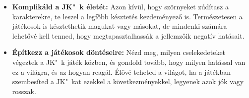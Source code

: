 \begin{itemize}
    \item \textbf{Komplikáld a JK"~k életét:} Azon kívül, hogy szörnyeket zúdítasz a karakterekre, te leszel a legfőbb késztetés kezdeményező is. Természetesen a játékosok is késztethetik magukat vagy másokat, de mindenki számára lehetővé kell tenned, hogy megtapasztalhassák a jellemzőik negatív hatásait.
    \item \textbf{Építkezz a játékosok döntéseire:} Nézd meg, milyen cselekedeteket végeztek a JK"~k játék közben, és gondold tovább, hogy milyen hatással van ez a világra, és az hogyan reagál. Élővé teheted a világot, ha a játékban szembesíted a JK"~kat ezekkel a következményekkel, legyenek azok jók vagy rosszak.
\end{itemize}
